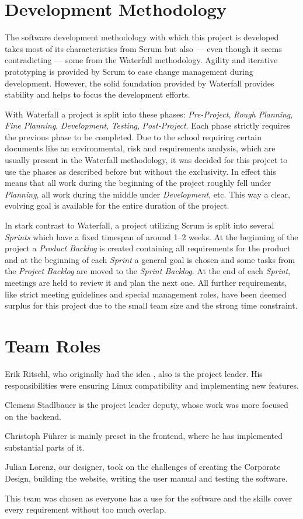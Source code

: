 \section{Development Methodology}
\def \kapitelautor {Clemens Stadlbauer}

The software development methodology with which this project is developed takes
most of its characteristics from Scrum but also --- even though it seems
contradicting --- some from the Waterfall methodology. Agility and iterative
prototyping is provided by Scrum to ease change management during development.
However, the solid foundation provided by Waterfall provides stability and
helps to focus the development efforts.

With Waterfall a project is split into these phases: \emph{Pre-Project},
\emph{Rough Planning}, \emph{Fine Planning}, \emph{Development},
\emph{Testing}, \emph{Post-Project}. Each phase strictly requires the previous
phase to be completed.
Due to the school requiring certain documents like an environmental, risk and
requirements analysis, which are usually present in the Waterfall methodology,
it was decided for this project to use the phases as described before but
without the exclusivity. In effect this means that all work during the
beginning of the project roughly fell under \emph{Planning}, all work during
the middle under \emph{Development}, etc. This way a clear, evolving goal is
available for the entire duration of the project.

In stark contrast to Waterfall, a project utilizing Scrum is split into several
\emph{Sprints} which have a fixed timespan of around 1--2
weeks. At the beginning of the project a \emph{Product Backlog} is created
containing all requirements for the product and at the beginning of each
\emph{Sprint} a general goal is chosen and some tasks from the \emph{Project
Backlog} are moved to the \emph{Sprint Backlog}. At the end of each
\emph{Sprint}, meetings are held to review it and plan the next one.  All
further requirements, like strict meeting guidelines and special management
roles, have been deemed surplus for this project due to the small team size and
the strong time constraint.

\section{Team Roles}
\def \kapitelautor {Clemens Stadlbauer}

Erik Ritschl, who originally had the idea %
, also is the project leader. His responsibilities were ensuring Linux
compatibility and implementing new features.

Clemens Stadlbauer is the project leader deputy, whose work was more focused on
the backend.

Christoph Führer is mainly preset in the frontend, where he has implemented
substantial parts of it.

Julian Lorenz, our designer, took on the challenges of creating the Corporate
Design, building the website, writing the user manual and testing the software.

This team was chosen as everyone has a use for the software and the skills
cover every requirement without too much overlap.
